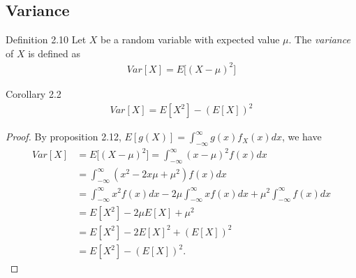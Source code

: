 \subsection{Variance}
\begin{boks}{Definition 2.10}
Let $X$ be a random variable with expected value $\mu$. The \textit{variance} of $X$ is defined as
\begin{align*}
    Var[X] = E\Big[ (X - \mu)^2 \Big]
\end{align*}
\end{boks}


\begin{boks}{Corollary 2.2}
\begin{align*}
    Var[X] = E[X^2] - (E[X])^2
\end{align*}
\end{boks}

\begin{proof}
By proposition 2.12, $E[g(X)] = \int_{-\infty}^\infty g(x)f_X(x)dx$, we have
\begin{align*}
    Var[X] &= E\Big[(X-\mu)^2\Big] = \int_{-\infty}^\infty (x - \mu)^2f(x) dx\\
    &= \int_{-\infty}^\infty (x^2 - 2x\mu + \mu^2) f(x) dx \\
    &= \int_{-\infty}^\infty x^2 f(x) dx - 2\mu \int_{-\infty}^\infty x f(x) dx + \mu^2\int_{-\infty}^\infty f(x)dx\\
    &=E[X^2] - 2\mu E[X] + \mu^2\\
    &= E[X^2] - 2 E[X]^2 + (E[X])^2\\
    &= E[X^2] - (E[X])^2.
\end{align*}
\end{proof}

%

